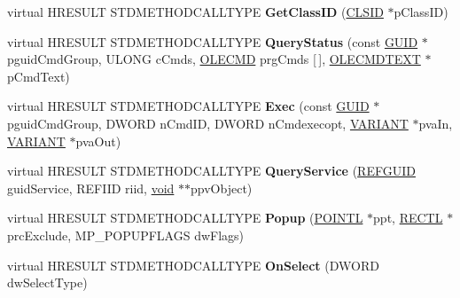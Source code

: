 \begin{DoxyCompactItemize}
\item 
\mbox{\label{class_c_menu_band_a7f8d84b43526d49bdf9d1fd06feed900}} 
virtual H\+R\+E\+S\+U\+LT S\+T\+D\+M\+E\+T\+H\+O\+D\+C\+A\+L\+L\+T\+Y\+PE {\bfseries Get\+Class\+ID} (\hyperlink{struct___i_i_d}{C\+L\+S\+ID} $\ast$p\+Class\+ID)
\item 
\mbox{\label{class_c_menu_band_aa846525e88bf67a5d0ec3bd2fda99130}} 
virtual H\+R\+E\+S\+U\+LT S\+T\+D\+M\+E\+T\+H\+O\+D\+C\+A\+L\+L\+T\+Y\+PE {\bfseries Query\+Status} (const \hyperlink{interface_g_u_i_d}{G\+U\+ID} $\ast$pguid\+Cmd\+Group, U\+L\+O\+NG c\+Cmds, \hyperlink{struct_i_ole_command_target_1_1__tag_o_l_e_c_m_d}{O\+L\+E\+C\+MD} prg\+Cmds \mbox{[}$\,$\mbox{]}, \hyperlink{struct_i_ole_command_target_1_1__tag_o_l_e_c_m_d_t_e_x_t}{O\+L\+E\+C\+M\+D\+T\+E\+XT} $\ast$p\+Cmd\+Text)
\item 
\mbox{\label{class_c_menu_band_a7a069a9a1ead1fd3f52cf8c4e7cd4e6f}} 
virtual H\+R\+E\+S\+U\+LT S\+T\+D\+M\+E\+T\+H\+O\+D\+C\+A\+L\+L\+T\+Y\+PE {\bfseries Exec} (const \hyperlink{interface_g_u_i_d}{G\+U\+ID} $\ast$pguid\+Cmd\+Group, D\+W\+O\+RD n\+Cmd\+ID, D\+W\+O\+RD n\+Cmdexecopt, \hyperlink{structtag_v_a_r_i_a_n_t}{V\+A\+R\+I\+A\+NT} $\ast$pva\+In, \hyperlink{structtag_v_a_r_i_a_n_t}{V\+A\+R\+I\+A\+NT} $\ast$pva\+Out)
\item 
\mbox{\label{class_c_menu_band_ac2cdfe50aa3ce620f93f83eb0daf1b54}} 
virtual H\+R\+E\+S\+U\+LT S\+T\+D\+M\+E\+T\+H\+O\+D\+C\+A\+L\+L\+T\+Y\+PE {\bfseries Query\+Service} (\hyperlink{struct___g_u_i_d}{R\+E\+F\+G\+U\+ID} guid\+Service, R\+E\+F\+I\+ID riid, \hyperlink{interfacevoid}{void} $\ast$$\ast$ppv\+Object)
\item 
\mbox{\label{class_c_menu_band_a06b205bf44d7acb2ab04ee433b5675d7}} 
virtual H\+R\+E\+S\+U\+LT S\+T\+D\+M\+E\+T\+H\+O\+D\+C\+A\+L\+L\+T\+Y\+PE {\bfseries Popup} (\hyperlink{struct___p_o_i_n_t_l}{P\+O\+I\+N\+TL} $\ast$ppt, \hyperlink{struct___r_e_c_t_l}{R\+E\+C\+TL} $\ast$prc\+Exclude, M\+P\+\_\+\+P\+O\+P\+U\+P\+F\+L\+A\+GS dw\+Flags)
\item 
\mbox{\label{class_c_menu_band_aec9908f4864030b605bb3253960cc382}} 
virtual H\+R\+E\+S\+U\+LT S\+T\+D\+M\+E\+T\+H\+O\+D\+C\+A\+L\+L\+T\+Y\+PE {\bfseries On\+Select} (D\+W\+O\+RD dw\+Select\+Type)
$$
\end{DoxyCompactItemize}
